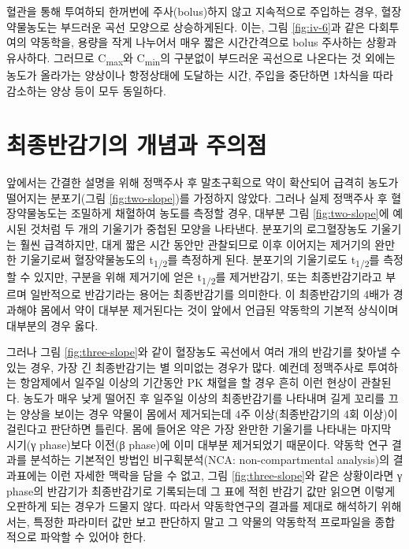 \documentclass[
  11pt,
  krantz2, a4paper, twoside]{krantz}
\theoremstyle{definition}
\theoremstyle{definition}
\theoremstyle{definition}
\theoremstyle{definition}
\theoremstyle{remark}
\begin{document}
혈관을 통해 투여하되 한꺼번에 주사(bolus)하지 않고 지속적으로 주입하는
경우, 혈장약물농도는 부드러운 곡선 모양으로 상승하게된다. 이는, 그림 \ref{fig:iv-6}과 같은 다회투여의 약동학을, 용량을 작게 나누어서 매우 짧은
시간간격으로 bolus 주사하는 상황과 유사하다. 그러므로 C\textsubscript{max}와 C\textsubscript{min}의
구분없이 부드러운 곡선으로 나온다는 것 외에는 농도가 올라가는 양상이나
항정상태에 도달하는 시간, 주입을 중단하면 1차식을 따라 감소하는 양상
등이 모두 동일하다.

\hypertarget{uxcd5cuxc885uxbc18uxac10uxae30uxc758-uxac1cuxb150uxacfc-uxc8fcuxc758uxc810}{%
\section{\texorpdfstring{최종반감기의 개념과 주의점}{최종반감기의 개념과 주의점}}\label{uxcd5cuxc885uxbc18uxac10uxae30uxc758-uxac1cuxb150uxacfc-uxc8fcuxc758uxc810}}

앞에서는 간결한 설명을 위해 정맥주사 후 말초구획으로 약이 확산되어
급격히 농도가 떨어지는 분포기(그림 \ref{fig:two-slope})를 가정하지 않았다. 그러나 실제
정맥주사 후 혈장약물농도는 조밀하게 채혈하여 농도를 측정할 경우, 대부분
그림 \ref{fig:two-slope}에 예시된 것처럼 두 개의 기울기가 중첩된 모양을 나타낸다.
분포기의 로그혈장농도 기울기는 훨씬 급격하지만, 대게 짧은 시간 동안만
관찰되므로 이후 이어지는 제거기의 완만한 기울기로써 혈장약물농도의
t\textsubscript{1/2}를 측정하게 된다. 분포기의 기울기로도 t\textsubscript{1/2}를 측정할 수 있지만,
구분을 위해 제거기에 얻은 t\textsubscript{1/2}를 제거반감기, 또는 최종반감기라고
부르며 일반적으로 반감기라는 용어는 최종반감기를 의미한다. 이
최종반감기의 4배가 경과해야 몸에서 약이 대부분 제거된다는 것이 앞에서
언급된 약동학의 기본적 상식이며 대부분의 경우 옳다.

그러나 그림 \ref{fig:three-slope}와 같이 혈장농도 곡선에서 여러 개의 반감기를 찾아낼 수 있는 경우, 가장 긴 최종반감기는 별 의미없는 경우가 많다. 
예컨데 정맥주사로 투여하는 항암제에서 일주일 이상의 기간동안 PK 채혈을 할 경우 흔히 이런 현상이 관찰된다.
농도가 매우 낮게 떨어진 후 일주일 이상의 최종반감기를 나타내며 길게 꼬리를 끄는 양상을 보이는 경우 약물이 몸에서 제거되는데 4주 이상(최종반감기의 4회 이상)이 걸린다고 판단하면 틀린다. 
몸에 들어온 약은 가장 완만한 기울기를 나타내는 마지막 시기(γ phase)보다 이전(β phase)에 이미 대부분 제거되었기 때문이다.
약동학 연구 결과를 분석하는 기본적인 방법인 비구획분석(NCA: non-compartmental analysis)의 결과표에는 이런 자세한 맥락을 담을 수 없고, 그림 \ref{fig:three-slope}와 같은 상황이라면 γ phase의 반감기가 최종반감기로 기록되는데 그 표에 적힌 반감기 값만 읽으면 이렇게 오판하게 되는 경우가 드물지 않다. 
따라서 약동학연구의 결과를 제대로 해석하기 위해서는, 특정한 파라미터 값만 보고 판단하지 말고 그 약물의 약동학적 프로파일을 종합적으로 파악할 수 있어야 한다.
\end{document}
